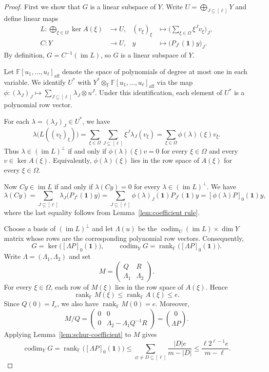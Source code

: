 \documentclass[11pt,reqno]{amsart}
\theoremstyle{plain}
\theoremstyle{definition}
\newcommand{\F}{\mathbb F}
\DeclareMathOperator{\codim}{codim}
\DeclareMathOperator{\rk}{rank}
\DeclareMathOperator{\im}{im}
\begin{document}
\begin{proof}
First we show that $G$ is a linear subspace of $Y$.
Write $U=\bigoplus_{J\subseteq[\ell]}Y$ and define linear maps
\begin{align*}
 L\colon\bigoplus_{\xi\in\Omega}\ker A(\xi)&\longrightarrow U,
 & (v_{\xi})_{\xi}&\longmapsto \biggl(\sum_{\xi\in\Omega}\xi^{J}v_{\xi}\biggr)_{J},\\
 C\colon Y&\longrightarrow U,
 & y&\longmapsto \bigl(P_{J^c}(\mathbf 1)y\bigr)_{J}.
\end{align*}
By definition, $G=C^{-1}(\im L)$, so $G$ is a linear subspace of $Y$.

Let $\F[u_1,\ldots,u_\ell]_{\mathrm{aff}}$ denote the space of polynomials of degree at most one in each variable. We identify $U^*$ with $Y^*\otimes_{\F}\F[u_1,\ldots,u_\ell]_{\mathrm{aff}}$ via the map $\phi\colon(\lambda_J)_J\mapsto\sum_{J\subseteq[\ell]}\lambda_J\otimes u^J$. Under this identification, each element of $U^*$ is a polynomial row vector.

For each $\lambda=(\lambda_J)_J\in U^*$, we have
\[
 \lambda\bigl(L((v_{\xi})_\xi)\bigr)
 =\sum_{\xi\in\Omega}\sum_{J\subseteq[\ell]}\xi^{J}\lambda_{J}(v_{\xi})
 =\sum_{\xi\in\Omega}\phi(\lambda)(\xi)v_{\xi}.
\]
Thus $\lambda\in(\im L)^\perp$ if and only if $\phi(\lambda)(\xi)v=0$ for every $\xi\in\Omega$ and every $v\in\ker A(\xi)$. Equivalently, $\phi(\lambda)(\xi)$ lies in the row space of $A(\xi)$ for every $\xi\in\Omega$.

Now $Cy\in\im L$ if and only if $\lambda(Cy)=0$ for every $\lambda\in(\im L)^\perp$. We have
\[
 \lambda(Cy)
 =\sum_{J\subseteq[\ell]}\lambda_{J}\bigl(P_{J^c}(\mathbf 1)y\bigr)
 =\sum_{J\subseteq[\ell]}\phi(\lambda)_{J}(\mathbf 1)P_{J^c}(\mathbf 1)y
 =[\phi(\lambda)P]_0(\mathbf 1)y,
\]
where the last equality follows from Lemma~\ref{lem:coefficient rule}.

Choose a basis of $(\im L)^\perp$ and let $\Lambda(u)$ be the $\codim_U(\im L)\times\dim Y$ matrix whose rows are the corresponding polynomial row vectors. Consequently,
\[
 G=\ker\bigl([\Lambda P]_0(\mathbf 1)\bigr),\qquad
 \codim_Y G=\rk_{\F}\bigl([\Lambda P]_0(\mathbf 1)\bigr).
\]
Write $\Lambda=(\Lambda_1,\Lambda_2)$ and set
\[
 M=\begin{pmatrix}Q&R\\ \Lambda_1&\Lambda_2\end{pmatrix}.
\]
For every $\xi\in\Omega$, each row of $M(\xi)$ lies in the row space
of $A(\xi)$. Hence
\[
 \rk_{\F}M(\xi)\leq \rk_{\F}A(\xi)\leq e.
\]
Since $Q(0)=I_e$, we also have $\rk_{\F}M(0)=e$. Moreover,
\[
 M/Q
 =\begin{pmatrix}0&0\\0&\Lambda_2-\Lambda_1Q^{-1}R\end{pmatrix}
 =\binom{0}{\Lambda P}.
\]
Applying Lemma~\ref{lem:schur-coefficient} to $M$ gives
\[
 \codim_Y G
 =\rk_{\F}\bigl([\Lambda P]_0(\mathbf 1)\bigr)
 \leq\sum_{\varnothing\ne D\subseteq[\ell]}\frac{|D|e}{m-|D|}
 \leq\frac{\ell 2^{\ell-1}e}{m-\ell}.
\]
\end{proof}
\end{document}
